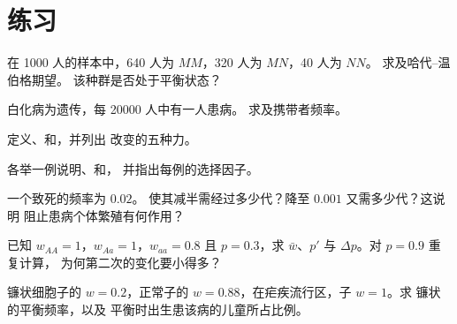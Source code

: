 \section{练习}

\begin{exercise}[$\star$]\label{exo:b2:population-genetics:1}
在 1000 人的样本中，640 人为 $MM$，320 人为 $MN$，40 人为 $NN$。
求及哈代–温伯格期望。
该种群是否处于平衡状态？
\end{exercise}

\begin{exercise}[$\star$]\label{exo:b2:population-genetics:2}
白化病为遗传，每 \num{20000} 人中有一人患病。
求及携带者频率。
\end{exercise}

\begin{exercise}[$\star$]\label{exo:b2:population-genetics:3}
定义、和，并列出
改变的五种力。
\end{exercise}

\begin{exercise}[$\star$]\label{exo:b2:population-genetics:4}
各举一例说明、和，
并指出每例的选择因子。
\end{exercise}

\begin{exercise}[$\star\star$]\label{exo:b2:population-genetics:5}
一个致死的频率为 $0.02$。
使其减半需经过多少代？降至 $0.001$ 又需多少代？这说明
阻止患病个体繁殖有何作用？
\end{exercise}

\begin{exercise}[$\star\star$]\label{exo:b2:population-genetics:6}
已知 $w_{AA} = 1$，$w_{Aa} = 1$，$w_{aa} = 0.8$ 且 $p = 0.3$，求
$\bar w$、$p'$ 与 $\Delta p$。对 $p = 0.9$ 重复计算，
为何第二次的变化要小得多？
\end{exercise}

\begin{exercise}[$\star\star$]\label{exo:b2:population-genetics:7}
镰状细胞子的 $w = 0.2$，正常子的
$w = 0.88$，在疟疾流行区，子 $w = 1$。求
镰状的平衡频率，以及
平衡时出生患该病的儿童所占比例。
\end{exercise}

